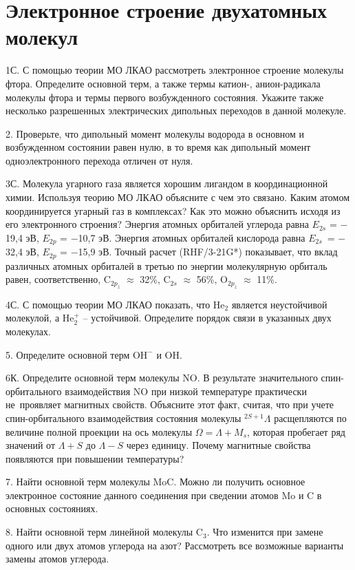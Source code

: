 \setmainfont{Noto Serif}
\setsansfont{Noto Sans}
\setmonofont{Noto Sans Mono}


\section{Электронное строение двухатомных молекул}

1С. С помощью теории МО ЛКАО рассмотреть электронное строение молекулы фтора. Определите основной терм, а также термы катион-, анион-радикала молекулы фтора и термы первого возбужденного состояния. Укажите также несколько разрешенных электрических дипольных переходов в данной молекуле.
\par
2. Проверьте, что дипольный момент молекулы водорода в основном и возбужденном состоянии равен нулю, в то время как дипольный момент одноэлектронного перехода отличен от нуля.
\par
3С. Молекула угарного газа является хорошим лигандом в координационной химии. Используя теорию МО ЛКАО объясните с чем это связано. Каким атомом координируется угарный газ в комплексах? Как это можно объяснить исходя из его электронного строения? Энергия атомных орбиталей углерода равна $E_{2s}$ = $-$19,4 эВ, $E_{2p}$ = $-$10,7 эВ. Энергия атомных орбиталей кислорода равна $E_{2s}$~= $-$32,4 эВ, $E_{2p}$ = $-$15,9 эВ. Точный расчет (RHF/3-21G*) показывает, что вклад различных атомных орбиталей в третью по энергии  молекулярную орбиталь равен, соответственно, $\text{C}_{2p_z}$ $\approx$ 32\%, $\text{C}_{2s}$ $\approx$ 56\%, $\text{O}_{2p_z}$ $\approx$ 11\%.
\par
4С. С помощью теории МО ЛКАО показать, что  $\text{He}_2$ является неустойчивой молекулой, а $\text{He}_2^{+}$ – устойчивой. Определите порядок связи в указанных двух молекулах.
\par
5. Определите основной терм $\text{OH}^-$ и $\text{OH}$.
\par
6К. Определите основной терм молекулы $\text{NO}$. В результате значительного спин-орбитального взаимодействия $\text{NO}$ при низкой температуре практически не~проявляет магнитных свойств. Объясните этот факт, считая, что при учете спин-орбитального взаимодействия состояния молекулы $^{2S+1}\Lambda$ расщепляются по величине полной проекции на ось молекулы $\Omega = \Lambda + M_s$, которая пробегает ряд значений от $\Lambda + S$ до $\Lambda - S$ через единицу. Почему магнитные свойства появляются при повышении температуры?
\par
7. Найти основной терм молекулы $\text{MoC}$. Можно ли получить основное электронное состояние данного соединения при сведении атомов $\text{Mo}$ и $\text{C}$ в основных состояниях.
\par
8. Найти основной терм линейной молекулы $\text{C}_3$. Что изменится при замене одного или двух атомов углерода на азот? Рассмотреть все возможные варианты замены атомов углерода. 
\par